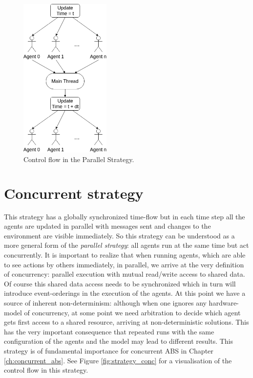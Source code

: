 \begin{figure}[H]
	\centering
	\includegraphics[width=0.4\textwidth, angle=0]{./fig/implabs/parallel.png}
	\caption{Control flow in the Parallel Strategy.}
	\label{fig:strategy_par}
\end{figure}

\section{Concurrent strategy}
\label{sub:con_strategy}
This strategy has a globally synchronized time-flow but in each time step all the agents are updated in parallel with messages sent and changes to the environment are visible immediately. So this strategy can be understood as a more general form of the \textit{parallel strategy}: all agents run at the same time but act concurrently. It is important to realize that when running agents, which are able to see actions by others immediately, in parallel, we arrive at the very definition of concurrency: parallel execution with mutual read/write access to shared data. Of course this shared data access needs to be synchronized which in turn will introduce event-orderings in the execution of the agents. At this point we have a source of inherent non-determinism: although when one ignores any hardware-model of concurrency, at some point we need arbitration to decide which agent gets first access to a shared resource, arriving at non-deterministic solutions. This has the very important consequence that repeated runs with the same configuration of the agents and the model may lead to different results. This strategy is of fundamental importance for concurrent ABS in Chapter \ref{ch:concurrent_abs}. See Figure \ref{fig:strategy_conc} for a visualisation of the control flow in this strategy.

